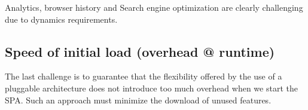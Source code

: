 Analytics, browser history and Search engine optimization are clearly challenging due to dynamics requirements.

\subsection{Speed of initial load (overhead @ runtime) }
The last challenge is to guarantee that the flexibility offered by the use of a pluggable architecture does not introduce too much overhead when we start the SPA. Such an approach must minimize the download of unused features.

